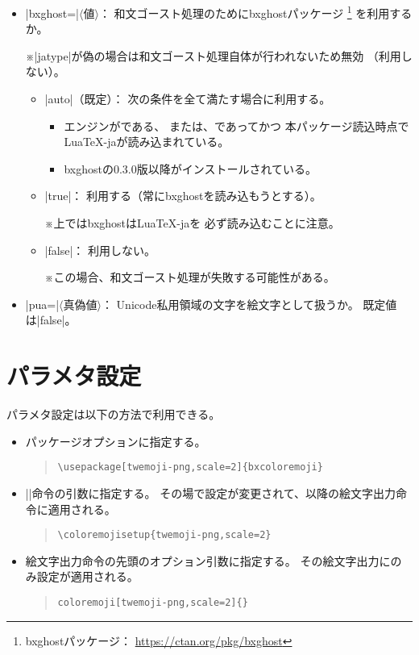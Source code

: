 \documentclass[a4paper]{ltjsarticle}
\renewcommand{\headfont}{\romanseries{sbc}\sffamily}
\newcommand{\CE}[1]{\coloremoji{#1}}
\newcommand{\Pkg}[1]{\textsf{#1}}
\newcommand{\Meta}[1]{$\langle$\mbox{}#1\mbox{}$\rangle$}
\newcommand{\Note}{\par\noindent ※}
\newcommand{\Means}{：\quad}
\newcommand{\／}{\mbox{}／\mbox{}}
\newcommand{\EG}{\eghostguarded}
\newcommand{\cs}[1]{\symbol{`\\}#1}
\providecommand{\Strong}[1]{{\headfont#1}}
\begin{document}
\begin{itemize}
\item |bxghost=|\Meta{値}\Means
  和文ゴースト処理のために\Pkg{bxghost}パッケージ
  \footnote{\Pkg{bxghost}パッケージ\Means
    \url{https://ctan.org/pkg/bxghost}}%
  を利用するか。
  \Note |jatype|が偽の場合は和文ゴースト処理自体が行われないため無効
  （利用しない）。
  \begin{itemize}
  \item |auto|（既定）\Means
    次の条件を\Strong{全て}満たす場合に利用する。
    \begin{itemize}
    \item エンジンが\EG{(u)\pLaTeX}である、
      または、{\LuaLaTeX}であってかつ
      本パッケージ\Strong{読込時点}で\Pkg{LuaTeX-ja}が読み込まれている。
    \item \Pkg{bxghost}の0.3.0版以降がインストールされている。
    \end{itemize}
  \item |true|\Means
    利用する（常に\Pkg{bxghost}を読み込もうとする）。
    \Note {\LuaLaTeX}上では\Pkg{bxghost}は\Pkg{LuaTeX-ja}を
    必ず読み込むことに注意。
  \item |false|\Means
    利用しない。
    \Note この場合、和文ゴースト処理が失敗する可能性がある。
  \end{itemize}

\item |pua=|\Meta{真偽値}\Means
  Unicode私用領域の文字を絵文字として扱うか。
  既定値は|false|。
\end{itemize}


\section{パラメタ設定}
\label{sec:Parameters}

パラメタ設定は以下の方法で利用できる。

\begin{itemize}
\item パッケージオプションに指定する。
\begin{quote}\small\begin{verbatim}
\usepackage[twemoji-png,scale=2]{bxcoloremoji}
\end{verbatim}\end{quote}
\item
  ||命令の引数に指定する。
  その場で設定が変更されて、以降の絵文字出力命令に適用される。
\begin{quote}\small\begin{verbatim}
\coloremojisetup{twemoji-png,scale=2}
\end{verbatim}\end{quote}
\item
  絵文字出力命令の先頭のオプション引数に指定する。
  その絵文字出力にのみ設定が適用される。
\begin{quote}\small\begin{alltt}
\cs{coloremoji}[twemoji-png,scale=2]\{\CE{☃}\}
\end{alltt}\end{quote}
\end{itemize}
\end{document}
